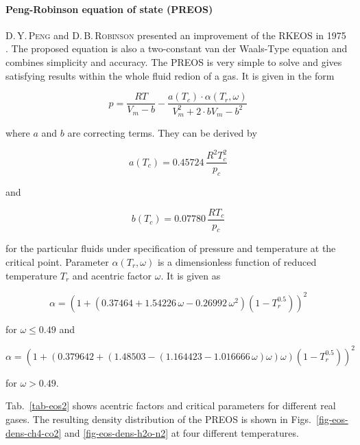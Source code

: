 \paragraph{Peng-Robinson equation of state (PREOS)}
D.\,Y.\,\textsc{Peng} and D.\,B.\,\textsc{Robinson} presented an improvement of the RKEOS in 1975 \cite{PenRob:75}. The proposed equation is also a two-constant van der Waals-Type equation and combines simplicity and accuracy. The PREOS is very simple to solve and gives satisfying results within the whole fluid redion of a gas. It is given in the form

\begin{equation}
p=\frac{RT}{V_m-b}-\frac{a(T_c)\cdot \alpha (T_r,\omega)}{V_m^2+2\cdot bV_m-b^2}
\label{eq-preos1}
\end{equation}

where $a$ and $b$ are correcting terms. They can be derived by %

\begin{equation} 
a(T_c) = 0.45724\,\frac{R^2T_{c}^{2}}{p_c}
\label{eq-preosa}
\end{equation}

and

\begin{equation} 
b(T_c) = 0.07780\,\frac{RT_c}{p_c}
\label{eq-preosb}
\end{equation}

for the particular fluids under specification of pressure and temperature at the critical point.
Parameter $\alpha(T_r,\omega)$ is a dimensionless function of reduced temperature $T_r$ and acentric factor $\omega$. It is given as

\begin{equation} 
\alpha = \left( 1+ \left(0.37464 + 1.54226\,\omega - 0.26992\,\omega^2\right)\left(1-T_r^{0.5}\right)\right)^2
\label{eq-preosalpha1}
\end{equation}

for $\omega\leq{0.49}$ and

\begin{equation} 
\alpha = \left( 1+ \left(0.379642 + \left(1.48503-\left(1.164423-1.016666\,\omega\right)\omega\right)\omega\right)\left(1-T_r^{0.5}\right)\right)^2
\label{eq-preosalpha2}
\end{equation}

for $\omega > 0.49$. 

Tab.~\ref{tab-eos2} shows acentric factors and critical parameters for different real gases. The resulting density distribution of the 
PREOS is shown in Figs.~\ref{fig-eos-dens-ch4-co2} and \ref{fig-eos-dens-h2o-n2} at four different temperatures. 

